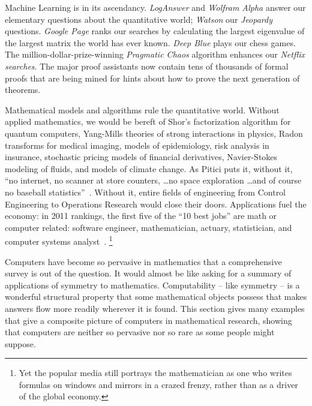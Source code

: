 \documentclass{llncs}
\begin{document}
Machine Learning is in its ascendancy.  {\it LogAnswer} and {\it
  Wolfram Alpha} answer our elementary questions about the
quantitative world; {\it Watson} our {\it Jeopardy} questions. {\it
  Google Page} ranks our searches by calculating the largest eigenvalue of the largest matrix
the world has ever known.  {\it Deep Blue} plays our chess
games. The million-dollar-prize-winning {\it Pragmatic Chaos}
algorithm enhances our {\it Netflix searches}.  The major proof
assistants now contain tens of thousands of formal proofs that are
being mined for hints about how to prove the next generation of
theorems.

Mathematical models and algorithms rule the quantitative world.
Without applied mathematics, we would be bereft of Shor's
factorization algorithm for quantum computers, Yang-Mills theories of
strong interactions in physics, Radon transforms for medical imaging,
models of epidemiology, risk analysis in insurance, stochastic pricing
models of financial derivatives, Navier-Stokes modeling of fluids, and
models of climate change. As Pitici puts it, without it, ``no
internet, no scanner at store counters, \dots no space exploration
\dots and of course no baseball statistics''~\cite{Pi11}.  Without
it, entire fields of engineering from Control Engineering to
Operations Research would close their doors.  Applications fuel the
economy: in 2011 rankings, the first five of the ``10 best jobs'' are
math or computer related: software engineer, mathematician, actuary,
statistician, and computer systems analyst~\cite{CC11}.  \footnote{Yet
  the popular media still portrays the mathematician as one who writes
  formulas on windows and mirrors in a crazed frenzy, rather than as a
  driver of the global economy.}








\bigskip

Computers have become so pervasive in mathematics that a comprehensive
survey is out of the question.  It would almost be like asking for a
summary of applications of symmetry to mathematics.  Computability --
like symmetry -- is a wonderful structural property that some
mathematical objects possess that makes answers flow more readily wherever
it is found.  This section gives many examples that give a composite
picture of computers in mathematical research, showing that computers
are neither so pervasive nor so rare as some people might suppose.
\end{document}
